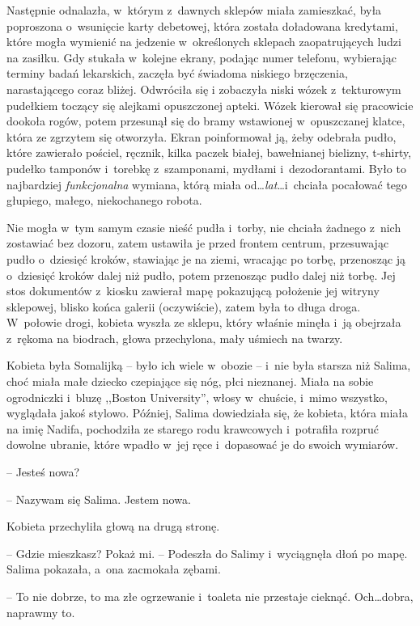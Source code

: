 \documentclass[oneside,polish,11pt,sfheadings]{mwbk}
\begin{document}
Następnie odnalazła, w~którym z~dawnych sklepów miała zamieszkać, była
poproszona o~wsunięcie karty debetowej, która została doładowana
kredytami, które mogła wymienić na jedzenie w~określonych sklepach
zaopatrujących ludzi na zasiłku. Gdy stukała w~kolejne ekrany, podając
numer telefonu, wybierając terminy badań lekarskich, zaczęła być
świadoma niskiego brzęczenia, narastającego coraz bliżej. Odwróciła się
i zobaczyła niski wózek z~tekturowym pudełkiem toczący się alejkami
opuszczonej apteki. Wózek kierował się pracowicie dookoła rogów, potem
przesunął się do bramy wstawionej w~opuszczanej klatce, która ze
zgrzytem się otworzyła. Ekran poinformował ją, żeby odebrała pudło,
które zawierało pościel, ręcznik, kilka paczek białej, bawełnianej
bielizny, t-shirty, pudełko tamponów i~torebkę z~szamponami, mydłami i~dezodorantami. Było to najbardziej \textit{funkcjonalna} wymiana, którą
miała od\ldots  \textit{lat}\ldots  i~chciała pocałować tego głupiego, małego,
niekochanego robota.

Nie mogła w~tym samym czasie nieść pudła i~torby, nie chciała żadnego z~nich zostawiać bez dozoru, zatem ustawiła je przed frontem centrum,
przesuwając pudło o~dziesięć kroków, stawiając je na ziemi, wracając po
torbę, przenosząc ją o~dziesięć kroków dalej niż pudło, potem przenosząc
pudło dalej niż torbę. Jej stos dokumentów z~kiosku zawierał mapę
pokazującą położenie jej witryny sklepowej, blisko końca galerii
(oczywiście), zatem była to długa droga. W~połowie drogi, kobieta wyszła
ze sklepu, który właśnie minęła i~ją obejrzała z~rękoma na biodrach,
głowa przechylona, mały uśmiech na twarzy.

Kobieta była Somalijką -- było ich wiele w~obozie -- i~nie była starsza
niż Salima, choć miała małe dziecko czepiające się nóg, płci nieznanej.
Miała na sobie ogrodniczki i~bluzę ,,Boston University'', włosy w~chuście, i~mimo wszystko, wyglądała jakoś stylowo. Później, Salima
dowiedziała się, że kobieta, która miała na imię Nadifa, pochodziła ze
starego rodu krawcowych i~potrafiła rozpruć dowolne ubranie, które
wpadło w~jej ręce i~dopasować je do swoich wymiarów.

-- Jesteś nowa?

-- Nazywam się Salima. Jestem nowa.

Kobieta przechyliła głową na drugą stronę. 

-- Gdzie mieszkasz? Pokaż mi. -- Podeszła do Salimy i~wyciągnęła dłoń po mapę. Salima pokazała, a~ona
zacmokała zębami. 

-- To nie dobrze, to ma złe ogrzewanie i~toaleta nie
przestaje cieknąć. Och\ldots  dobra, naprawmy to.
\end{document}
